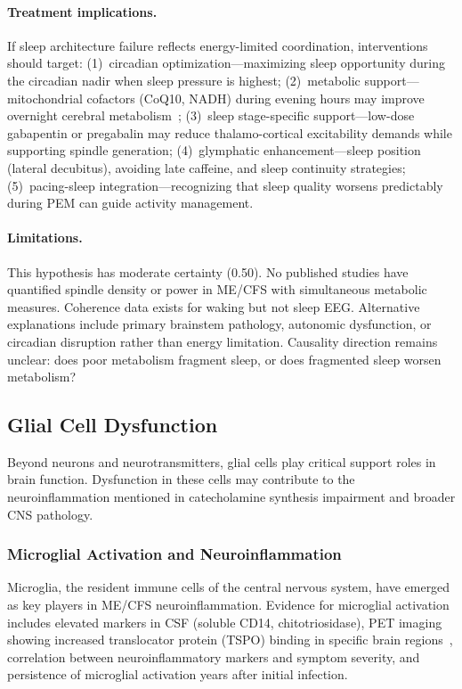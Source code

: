 \begin{hypothesis}
\paragraph{Treatment implications.}
If sleep architecture failure reflects energy-limited coordination, interventions should target: (1)~circadian optimization---maximizing sleep opportunity during the circadian nadir when sleep pressure is highest; (2)~metabolic support---mitochondrial cofactors (CoQ10, NADH) during evening hours may improve overnight cerebral metabolism~\cite{CastroMarrero2021CoQ10}; (3)~sleep stage-specific support---low-dose gabapentin or pregabalin may reduce thalamo-cortical excitability demands while supporting spindle generation; (4)~glymphatic enhancement---sleep position (lateral decubitus), avoiding late caffeine, and sleep continuity strategies; (5)~pacing-sleep integration---recognizing that sleep quality worsens predictably during PEM can guide activity management.

\paragraph{Limitations.}
This hypothesis has moderate certainty (0.50). No published studies have quantified spindle density or power in ME/CFS with simultaneous metabolic measures. Coherence data exists for waking but not sleep EEG. Alternative explanations include primary brainstem pathology, autonomic dysfunction, or circadian disruption rather than energy limitation. Causality direction remains unclear: does poor metabolism fragment sleep, or does fragmented sleep worsen metabolism?
\end{hypothesis}

\subsection{Glial Cell Dysfunction}
\label{sec:glial}

Beyond neurons and neurotransmitters, glial cells play critical support roles in brain function. Dysfunction in these cells may contribute to the neuroinflammation mentioned in catecholamine synthesis impairment and broader CNS pathology.

\subsubsection{Microglial Activation and Neuroinflammation}

Microglia, the resident immune cells of the central nervous system, have emerged as key players in ME/CFS neuroinflammation. Evidence for microglial activation includes elevated markers in CSF (soluble CD14, chitotriosidase), PET imaging showing increased translocator protein (TSPO) binding in specific brain regions~\cite{Nakatomi2014neuroinflammation}, correlation between neuroinflammatory markers and symptom severity, and persistence of microglial activation years after initial infection.

